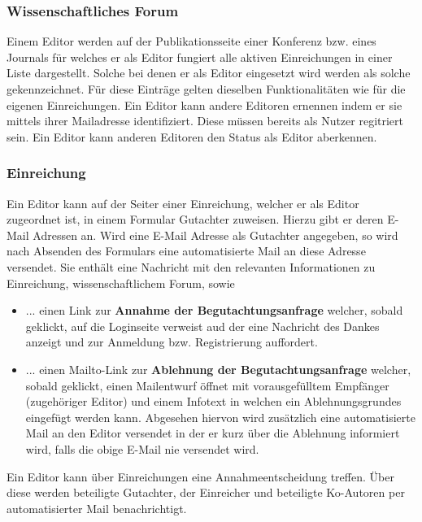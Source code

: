 \subsubsection{Wissenschaftliches Forum}
\begin{description}
     Einem Editor werden auf der Publikationsseite einer Konferenz bzw. eines Journals für
    welches er als Editor fungiert alle aktiven Einreichungen in einer Liste dargestellt.
    Solche bei denen er als Editor eingesetzt wird werden als solche gekennzeichnet.
    Für diese Einträge gelten dieselben Funktionalitäten wie für die eigenen Einreichungen. %
     Ein Editor kann andere Editoren ernennen indem er sie mittels ihrer Mailadresse identifiziert.
    Diese müssen bereits als Nutzer regitriert sein.
     Ein Editor kann anderen Editoren den Status als Editor aberkennen.
\end{description}

\subsubsection{Einreichung}
\begin{description}
     Ein Editor kann auf der Seiter einer Einreichung, welcher er als Editor zugeordnet ist,
    in einem Formular Gutachter zuweisen. Hierzu gibt er deren E-Mail Adressen an.
     Wird eine E-Mail Adresse als Gutachter angegeben, so wird nach Absenden des Formulars
    eine automatisierte Mail an diese Adresse versendet. Sie enthält eine Nachricht mit den relevanten
    Informationen zu Einreichung, wissenschaftlichem Forum, sowie
    \begin{itemize}
        \item ... einen Link zur \textbf{Annahme der Begutachtungsanfrage} welcher, sobald geklickt,
        auf die Loginseite verweist aud der eine Nachricht des Dankes anzeigt und zur Anmeldung bzw.
        Registrierung auffordert.
        \item ... einen Mailto-Link zur \textbf{Ablehnung der Begutachtungsanfrage} welcher, sobald
        geklickt, einen Mailentwurf öffnet mit vorausgefülltem Empfänger (zugehöriger Editor)
        und einem Infotext in welchen ein Ablehnungsgrundes eingefügt werden kann.
        Abgesehen hiervon wird zusätzlich eine automatisierte Mail an den Editor versendet in der er
        kurz über die Ablehnung informiert wird, falls die obige E-Mail nie versendet wird.
    \end{itemize}
     Ein Editor kann über Einreichungen eine Annahmeentscheidung treffen. Über diese werden
    beteiligte Gutachter, der Einreicher und beteiligte Ko-Autoren per automatisierter Mail benachrichtigt.
\end{description}

